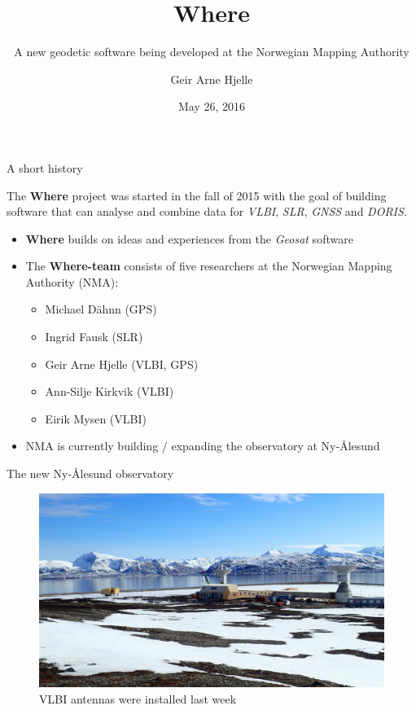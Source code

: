 \documentclass[ignorenonframetext,12pt,t]{beamer}
\title{Where}
\subtitle{A new geodetic software being developed at the Norwegian Mapping
Authority}
\author{Geir Arne Hjelle}
\date{May 26, 2016}
\providecommand{\tightlist}{%
  \setlength{\itemsep}{0pt}\setlength{\parskip}{0pt}}
\begin{document}
\frame{\titlepage}

\begin{frame}{A short history}

The \textbf{Where} project was started in the fall of 2015 with the goal
of building software that can analyse and combine data for \emph{VLBI},
\emph{SLR}, \emph{GNSS} and \emph{DORIS}.

\begin{itemize}
\item
  \textbf{Where} builds on ideas and experiences from the \emph{Geosat}
  software
\item
  The \textbf{Where-team} consists of five researchers at the Norwegian
  Mapping Authority (NMA):

  \begin{itemize}
  \tightlist
  \item
    Michael Dähnn (GPS)
  \item
    Ingrid Fausk (SLR)
  \item
    Geir Arne Hjelle (VLBI, GPS)
  \item
    Ann-Silje Kirkvik (VLBI)
  \item
    Eirik Mysen (VLBI)
  \end{itemize}
\item
  NMA is currently building / expanding the observatory at Ny-Ålesund
\end{itemize}

\end{frame}

\begin{frame}{The new Ny-Ålesund observatory}

\begin{figure}[htbp]
\centering
\includegraphics{nyal_antennas.jpg}
\caption{VLBI antennas were installed last week}
\end{figure}

\end{frame}
\end{document}
